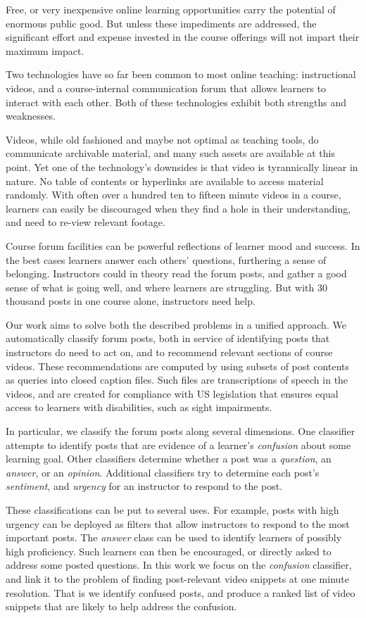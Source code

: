 \documentclass{edm_template}
\begin{document}
Free, or very inexpensive online learning opportunities carry the
potential of enormous public good. But unless these impediments are
addressed, the significant effort and expense invested in the course
offerings will not impart their maximum impact.

Two technologies have so far been common to most online teaching:
instructional videos, and a course-internal communication forum that
allows learners to interact with each other. Both of these
technologies exhibit both strengths and weaknesses.

Videos, while old fashioned and maybe not optimal as teaching tools,
do communicate archivable material, and many such assets are available
at this point. Yet one of the technology's downsides is that video is
tyrannically linear in nature. No table of contents or hyperlinks are
available to access material randomly. With often over a hundred ten
to fifteen minute videos in a course, learners can easily be
discouraged when they find a hole in their understanding, and need to
re-view relevant footage.

Course forum facilities can be powerful reflections of learner mood
and success. In the best cases learners answer each others' questions,
furthering a sense of belonging. Instructors could in theory read the
forum posts, and gather a good sense of what is going well, and where
learners are struggling. But with 30 thousand posts in one course
alone, instructors need help.

Our work aims to solve both the described problems in a unified
approach. We automatically classify forum posts, both in service of
identifying posts that instructors do need to act on, and to recommend
relevant sections of course videos. These recommendations are computed
by using subsets of post contents as queries into closed caption
files. Such files are transcriptions of speech in the videos, and are
created for compliance with US legislation that ensures equal access
to learners with disabilities, such as sight impairments.

In particular, we classify the forum posts along several
dimensions. One classifier attempts to identify posts that are
evidence of a learner's {\em confusion} about some learning
goal. Other classifiers determine whether a post was a {\em question},
an {\em answer}, or an {\em opinion}. Additional classifiers try to
determine each post's {\em sentiment}, and {\em urgency} for an
instructor to respond to the post.

These classifications can be put to several uses. For example, posts
with high urgency can be deployed as filters that allow instructors to
respond to the most important posts. The {\em answer} class can be
used to identify learners of possibly high proficiency. Such learners
can then be encouraged, or directly asked to address some posted
questions. In this work we focus on the {\em confusion} classifier,
and link it to the problem of finding post-relevant video snippets at
one minute resolution. That is we identify confused posts, and produce
a ranked list of video snippets that are likely to help address the
confusion.
\end{document}
